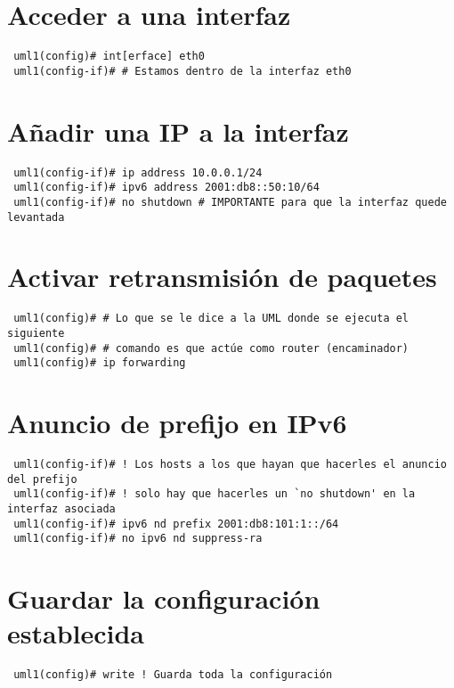 \documentclass{article}
\begin{document}
\section{Acceder a una interfaz}
\begin{verbatim}
 uml1(config)# int[erface] eth0
 uml1(config-if)# # Estamos dentro de la interfaz eth0
\end{verbatim}

\section{Añadir una IP a la interfaz}
\begin{verbatim}
 uml1(config-if)# ip address 10.0.0.1/24
 uml1(config-if)# ipv6 address 2001:db8::50:10/64
 uml1(config-if)# no shutdown # IMPORTANTE para que la interfaz quede levantada
\end{verbatim}

\section{Activar retransmisión de paquetes}
\begin{verbatim}
 uml1(config)# # Lo que se le dice a la UML donde se ejecuta el siguiente
 uml1(config)# # comando es que actúe como router (encaminador)
 uml1(config)# ip forwarding
\end{verbatim}

\section{Anuncio de prefijo en IPv6}
\begin{verbatim}
 uml1(config-if)# ! Los hosts a los que hayan que hacerles el anuncio del prefijo
 uml1(config-if)# ! solo hay que hacerles un `no shutdown' en la interfaz asociada
 uml1(config-if)# ipv6 nd prefix 2001:db8:101:1::/64
 uml1(config-if)# no ipv6 nd suppress-ra
\end{verbatim}



\section{Guardar la configuración establecida}
\begin{verbatim}
 uml1(config)# write ! Guarda toda la configuración
\end{verbatim}
\end{document}

